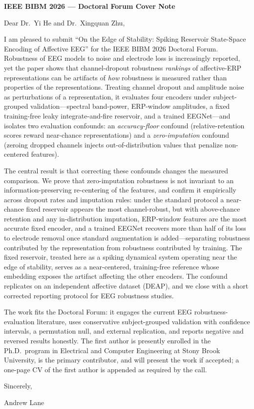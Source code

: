 \documentclass[11pt]{article}
\begin{document}
\begin{center}
{\large\textbf{IEEE BIBM 2026 --- Doctoral Forum Cover Note}}
\end{center}

\vspace{1em}

Dear Dr.\ Yi He and Dr.\ Xingquan Zhu,

I am pleased to submit ``On the Edge of Stability: Spiking Reservoir State-Space Encoding of Affective EEG'' for the IEEE BIBM 2026 Doctoral Forum. Robustness of EEG models to noise and electrode loss is increasingly reported, yet the paper shows that channel-dropout robustness \emph{rankings} of affective-ERP representations can be artifacts of \emph{how} robustness is measured rather than properties of the representations. Treating channel dropout and amplitude noise as perturbations of a representation, it evaluates four encoders under subject-grouped validation---spectral band-power, ERP-window amplitudes, a fixed training-free leaky integrate-and-fire reservoir, and a trained EEGNet---and isolates two evaluation confounds: an \emph{accuracy-floor} confound (relative-retention scores reward near-chance representations) and a \emph{zero-imputation} confound (zeroing dropped channels injects out-of-distribution values that penalize non-centered features).

The central result is that correcting these confounds changes the measured comparison. We prove that zero-imputation robustness is not invariant to an information-preserving re-centering of the features, and confirm it empirically across dropout rates and imputation rules: under the standard protocol a near-chance fixed reservoir appears the most channel-robust, but with above-chance retention and any in-distribution imputation, ERP-window features are the most accurate fixed encoder, and a trained EEGNet recovers more than half of its loss to electrode removal once standard augmentation is added---separating robustness contributed by the representation from robustness contributed by training. The fixed reservoir, treated here as a spiking dynamical system operating near the edge of stability, serves as a near-centered, training-free reference whose embedding exposes the artifact affecting the other encoders. The confound replicates on an independent affective dataset (DEAP), and we close with a short corrected reporting protocol for EEG robustness studies.

The work fits the Doctoral Forum: it engages the current EEG robustness-evaluation literature, uses conservative subject-grouped validation with confidence intervals, a permutation null, and external replication, and reports negative and reversed results honestly. The first author is presently enrolled in the Ph.D.\ program in Electrical and Computer Engineering at Stony Brook University, is the primary contributor, and will present the work if accepted; a one-page CV of the first author is appended as required by the call.

\vspace{1em}

Sincerely,

Andrew Lane
\end{document}
